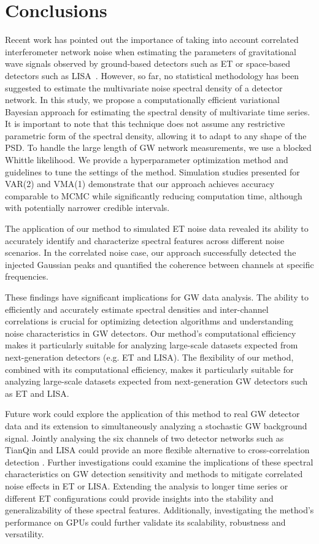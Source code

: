 \documentclass[%
 reprint,
 amsmath,amssymb,
 aps,
 nofootinbib,
]{revtex4-2}
\begin{document}
\section{Conclusions}
\label{sec:Discussion}
Recent work has pointed out the importance of taking into account correlated interferometer network noise when estimating the parameters of gravitational wave signals observed by ground-based detectors such as ET or space-based detectors such as LISA~\cite{ET_design_report, Janssens2023, LISA_red_book}.
However, so far, no statistical methodology has been suggested to estimate the multivariate noise spectral density of a detector network.
In this study, we propose a computationally efficient variational Bayesian approach for estimating the spectral density of multivariate time series. 
It is important to note that this technique does not assume any restrictive parametric form of the spectral density, allowing it to adapt to any shape of the PSD.
To handle the large length of GW network measurements, we use a blocked Whittle likelihood. 
We provide a hyperparameter optimization method and guidelines to tune the settings of the method. 
Simulation studies presented for VAR(2) and VMA(1) demonstrate that our approach achieves accuracy comparable to MCMC while significantly reducing computation time, although with potentially narrower credible intervals.

The application of our method to simulated ET noise data revealed its ability to accurately identify and characterize spectral features across different noise scenarios.
In the correlated noise case, our approach successfully detected the injected Gaussian peaks and quantified the coherence between channels at specific frequencies. 


These findings have significant implications for GW data analysis. The ability to efficiently and accurately estimate spectral densities and inter-channel correlations is crucial for optimizing detection algorithms and understanding noise characteristics in GW detectors. Our method's computational efficiency makes it particularly suitable for analyzing large-scale datasets expected from next-generation detectors (e.g. ET and LISA). The flexibility of our method, combined with its computational efficiency, makes it particularly suitable for analyzing large-scale datasets expected from next-generation GW detectors such as ET and LISA.

Future work could explore the application of this method to real GW detector data and its extension to simultaneously analyzing a stochastic GW background signal. Jointly analysing the six channels of two detector networks such as TianQin and LISA could provide an more flexible alternative to cross-correlation detection  \cite{liang2024}.
Further investigations could examine the implications of these spectral characteristics on GW detection sensitivity and methods to mitigate correlated noise effects in ET or LISA. Extending the analysis to longer time series or different ET configurations could provide insights into the stability and generalizability of these spectral features.
Additionally, investigating the method's performance on GPUs could further validate its scalability, robustness and versatility.
\end{document}
